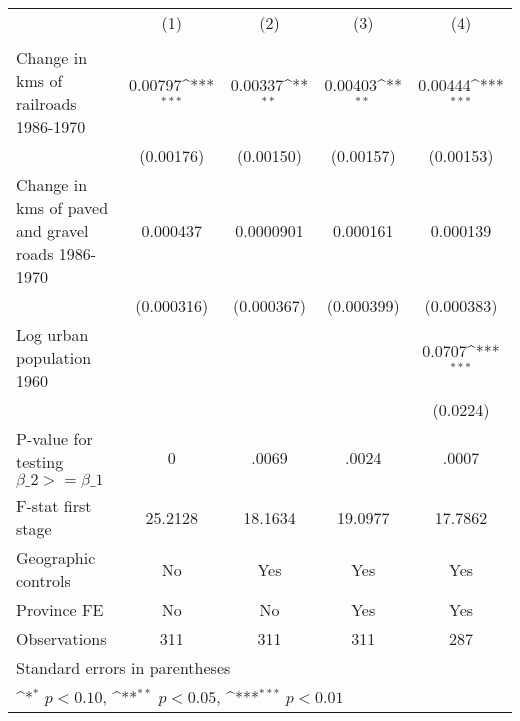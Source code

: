 {
\def\sym#1{\ifmmode^{#1}\else\(^{#1}\)\fi}
\begin{tabular}{l*{4}{c}}
\hline\hline
                &\multicolumn{1}{c}{(1)}&\multicolumn{1}{c}{(2)}&\multicolumn{1}{c}{(3)}&\multicolumn{1}{c}{(4)}\\
                &\multicolumn{1}{c}{}&\multicolumn{1}{c}{}&\multicolumn{1}{c}{}&\multicolumn{1}{c}{}\\
\hline
Change in kms of railroads 1986-1970&  0.00797\sym{***}&  0.00337\sym{**} &  0.00403\sym{**} &  0.00444\sym{***}\\
                &(0.00176)         &(0.00150)         &(0.00157)         &(0.00153)         \\
[1em]
Change in kms of paved and gravel roads 1986-1970& 0.000437         &0.0000901         & 0.000161         & 0.000139         \\
                &(0.000316)         &(0.000367)         &(0.000399)         &(0.000383)         \\
[1em]
Log urban population 1960&                  &                  &                  &   0.0707\sym{***}\\
                &                  &                  &                  & (0.0224)         \\
\hline
P-value for testing $\beta\_{2} >= \beta\_{1}$&        0         &    .0069         &    .0024         &    .0007         \\
F-stat first stage&  25.2128         &  18.1634         &  19.0977         &  17.7862         \\
Geographic controls&       No         &      Yes         &      Yes         &      Yes         \\
Province FE     &       No         &       No         &      Yes         &      Yes         \\
Observations    &      311         &      311         &      311         &      287         \\
\hline\hline
\multicolumn{5}{l}{\footnotesize Standard errors in parentheses}\\
\multicolumn{5}{l}{\footnotesize \sym{*} \(p<0.10\), \sym{**} \(p<0.05\), \sym{***} \(p<0.01\)}\\
\end{tabular}
}
